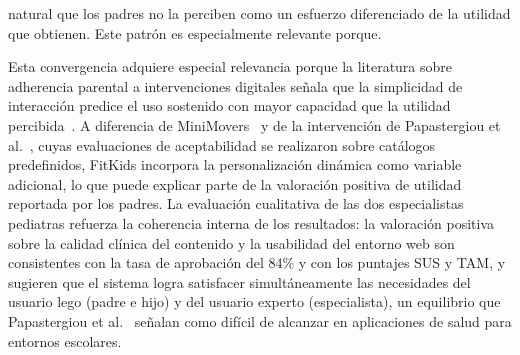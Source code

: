 natural que los padres no la perciben como un esfuerzo diferenciado de la utilidad que obtienen. Este patrón es especialmente relevante porque.
			
			Esta convergencia adquiere especial relevancia porque la literatura sobre adherencia parental a intervenciones digitales señala que la simplicidad de interacción predice el uso sostenido con mayor capacidad que la utilidad percibida~\cite{VegaDiaz2023,Yao2015}. A diferencia de MiniMovers~\cite{Zhang2024} y de la intervención de Papastergiou et al.~\cite{Papastergiou2021}, cuyas evaluaciones de aceptabilidad se realizaron sobre catálogos predefinidos, FitKids incorpora la personalización dinámica como variable adicional, lo que puede explicar parte de la valoración positiva de utilidad reportada por los padres. La evaluación cualitativa de las dos especialistas pediatras refuerza la coherencia interna de los resultados: la valoración positiva sobre la calidad clínica del contenido y la usabilidad del entorno web son consistentes con la tasa de aprobación del 84\% y con los puntajes SUS y TAM, y sugieren que el sistema logra satisfacer simultáneamente las necesidades del usuario lego (padre e hijo) y del usuario experto (especialista), un equilibrio que Papastergiou et al.~\cite{Papastergiou2021} señalan como difícil de alcanzar en aplicaciones de salud para entornos escolares.
			
